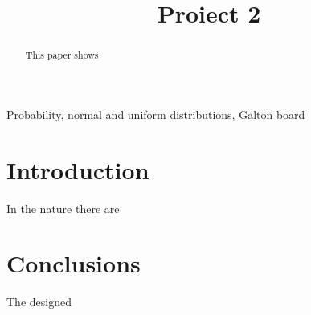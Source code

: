 \documentclass[conference]{IEEEtran}
\begin{document}
\title{Proiect 2}

\author{

}

\maketitle

\begin{abstract}
This paper shows 

\end{abstract}

\begin{IEEEkeywords}
Probability, normal and uniform distributions, Galton board
\end{IEEEkeywords}

\section{Introduction}
In the nature there are 
\section{Conclusions}
The designed 




\end{document}
